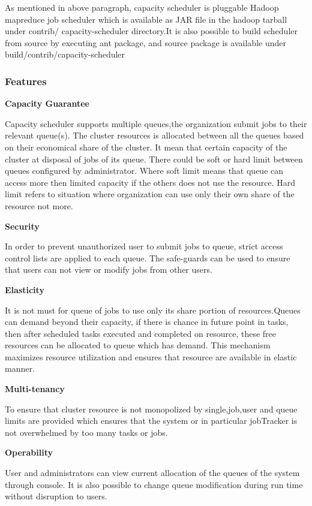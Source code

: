  As mentioned in above paragraph, capacity scheduler is pluggable Hadoop mapreduce job scheduler which is available as JAR file in the hadoop tarball under contrib/ capacity-scheduler directory.It is also possible to build scheduler from source by executing ant package, and source package is available under build/contrib/capacity-scheduler
 
   

 
 
 \subsubsection*{Features}
 \textbf{Capacity Guarantee}

Capacity scheduler supports multiple queues,the organization submit jobs to their relevant queue(s). The cluster resources is allocated between all the queues based on their economical share of the cluster. It mean that certain capacity of the cluster at disposal of jobs of its queue. There could be soft or hard limit between queues configured by administrator. Where soft limit means that queue can access more then limited capacity if the others does not use the resource. Hard limit refers to situation where organization can use only their own share of the resource not more. 


 
 \textbf{Security}
 
In order to prevent unauthorized user to submit jobs to queue, strict access control lists are applied to each queue. The safe-guards can be used to ensure that users can not view or modify jobs from other users.   
 

\textbf{Elasticity } 

It is not must for queue of jobs to use only its share portion of resources.Queues can demand beyond their capacity, if there is chance in future point in tasks, then after scheduled tasks executed and completed on resource, these free resources can be allocated to queue which has demand. This mechanism maximizes resource utilization and ensures that resource are available in elastic manner. 


\textbf{Multi-tenancy }

To ensure that cluster resource is not monopolized by single,job,user and queue limits are provided which ensures that the system or in particular jobTracker is not overwhelmed by too many tasks or jobs. 

\textbf{Operability }

User and administrators can view current allocation of the queues of the system through console. It is also possible to change queue modification during run time without disruption to users. 


